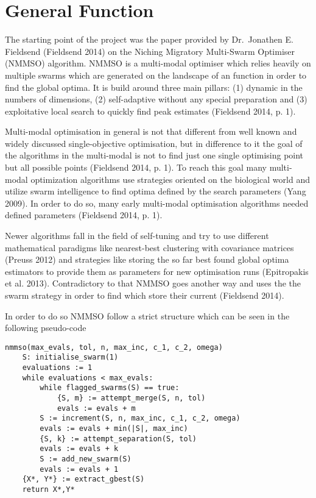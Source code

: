 \documentclass[12pt,a4paper]{article}
\begin{document}
\section{General Function}\label{general-function}

The starting point of the project was the paper provided by Dr.~Jonathen
E. Fieldsend (Fieldsend 2014) on the Niching Migratory Multi-Swarm
Optimiser (NMMSO) algorithm. NMMSO is a multi-modal optimiser which
relies heavily on multiple swarms which are generated on the landscape
of an function in order to find the global optima. It is build around
three main pillars: (1) dynamic in the numbers of dimensions, (2)
self-adaptive without any special preparation and (3) exploitative local
search to quickly find peak estimates (Fieldsend 2014, p. 1).

Multi-modal optimisation in general is not that different from well
known and widely discussed single-objective optimisation, but in
difference to it the goal of the algorithms in the multi-modal is not to
find just one single optimising point but all possible points (Fieldsend
2014, p. 1). To reach this goal many multi-modal optimization algorithms
use strategies oriented on the biological world and utilize swarm
intelligence to find optima defined by the search parameters (Yang
2009). In order to do so, many early multi-modal optimisation algorithms
needed defined parameters (Fieldsend 2014, p. 1).

Newer algorithms fall in the field of self-tuning and try to use
different mathematical paradigms like nearest-best clustering with
covariance matrices (Preuss 2012) and strategies like storing the so far
best found global optima estimators to provide them as parameters for
new optimisation runs (Epitropakis et al. 2013). Contradictory to that
NMMSO goes another way and uses the the swarm strategy in order to find
which store their current (Fieldsend 2014).

In order to do so NMMSO follow a strict structure which can be seen in
the following pseudo-code

\begin{verbatim}
nmmso(max_evals, tol, n, max_inc, c_1, c_2, omega)
    S: initialise_swarm(1)
    evaluations := 1
    while evaluations < max_evals:
        while flagged_swarms(S) == true:
            {S, m} := attempt_merge(S, n, tol)
            evals := evals + m
        S := increment(S, n, max_inc, c_1, c_2, omega)
        evals := evals + min(|S|, max_inc)
        {S, k} := attempt_separation(S, tol)
        evals := evals + k
        S := add_new_swarm(S)
        evals := evals + 1
    {X*, Y*} := extract_gbest(S)
    return X*,Y*
\end{verbatim}
\end{document}
